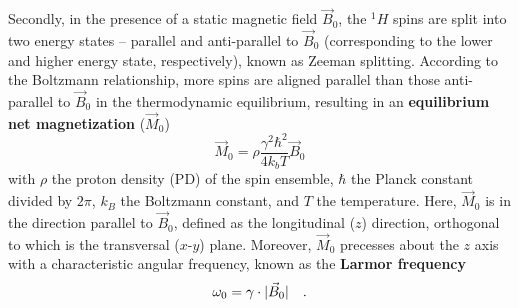 Secondly, in the presence of a static magnetic field $\vec{B}_0$, the $^{1}H$ spins are split into two energy states -- parallel and anti-parallel to $\vec{B}_0$ (corresponding to the lower and higher energy state, respectively), known as Zeeman splitting. According to the Boltzmann relationship, more spins are aligned parallel than those anti-parallel to $\vec{B}_0$ in the thermodynamic equilibrium, resulting in an \textbf{equilibrium net magnetization} ($\vec{M}_0$) 
\begin{equation}
  \vec{M}_0 = \rho \frac{\gamma^{2} \hbar^{2}}{4 k_{b} T} \vec{B}_0
\end{equation}
with $\rho$ the proton density (\acs{PD}) of the spin ensemble, $\hbar$ the Planck constant divided by $2\pi$, $k_B$ the Boltzmann constant, and $T$ the temperature. Here, $\vec{M}_0$ is in the direction parallel to $\vec{B}_0$, defined as the longitudinal ($z$) direction, orthogonal to which is the transversal ($x$-$y$) plane. Moreover, $\vec{M}_0$ precesses about the $z$ axis with a characteristic angular frequency, known as the \textbf{Larmor frequency}
\begin{equation}
  \omega_0 = \gamma \cdot \lvert\vec{B}_0\rvert \quad .
\end{equation}

